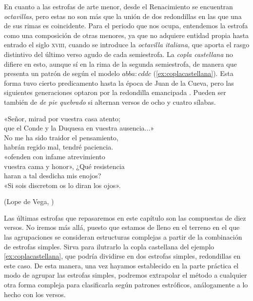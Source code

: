 En cuanto a las estrofas de arte menor, desde el Renacimiento se encuentran \textit{octavillas}, pero estas no son más que la unión de dos redondillas en las que una de sus rimas es coincidente. Para el periodo que nos ocupa, entendemos la estrofa como una composición de otras menores, ya que no adquiere entidad propia hasta entrado el siglo \textsc{xviii}, cuando se introduce la \textit{octavilla italiana}, que aporta el rasgo distintivo del último verso agudo de cada semiestrofa. La \textit{copla castellana} no difiere en esto, aunque sí en la rima de la segunda semiestrofa, de manera que presenta un patrón de según el modelo $abba:cddc$  (\ref{ex:coplacastellana}). Esta forma tuvo cierto predicamento hasta la época de Juan de la Cueva, pero las siguientes generaciones optaron por la redondilla emancipada \parencite[267]{navarrotomas1991}. Pueden ser también de \textit{de pie quebrado} si alternan versos de ocho y cuatro sílabas.

\begin{exe}
	\ex\label{ex:octavareal}«Señor, mirad por vuestra casa atento;\\
	que el Conde y la Duquesa en vuestra ausencia...»\\
	No me ha sido traidor el pensamiento,\\
	habrán regido mal, tendré paciencia.\\
	«ofenden con infame atrevimiento\\
	vuestra cama y honor», ¿Qué resistencia\\
	haran a tal desdicha mis enojos?\\
	«Si sois discretom os lo diran los ojos».\\
	\strut\hfill(Lope de Vega, )
	\end{exe}

Las últimas estrofas que repasaremos en este capítulo son las compuestas de diez versos. No iremos más allá, puesto que estamos de lleno en el terreno en el que las agrupaciones se consideran estructuras complejas a partir de la combinación de estrofas simples. Sirva para ilutrarlo la copla castellana del ejemplo \ref{ex:coplacastellana}, que podría dividirse en dos estrofas simples, redondillas en este caso. De esta manera, una vez hayamos establecido en la parte práctica el modo de agrupar las estrofas simples, podremos extrapolar el método a cualquier otra forma compleja para clasificarla según patrones estróficos, análogamente a lo hecho con los versos.

